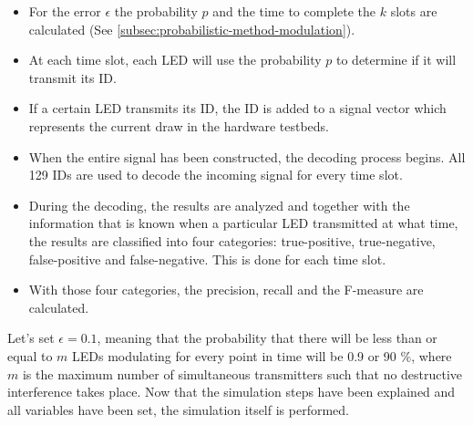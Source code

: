 \begin{itemize}

	\item For the error $\epsilon$ the probability $p$ and the time to complete the $k$ slots are calculated (See \autoref{subsec:probabilistic-method-modulation}).

	\item At each time slot, each LED will use the probability $p$ to determine if it will transmit its ID.

	\item If a certain LED transmits its ID, the ID is added to a signal vector which represents the current draw in the hardware testbeds.

	\item When the entire signal has been constructed, the decoding process begins. All 129 IDs are used to decode the incoming signal for every time slot.

	\item During the decoding, the results are analyzed and together with the information that is known when a particular LED transmitted at what time, the results are classified into four categories: true-positive, true-negative, false-positive and false-negative. This is done for each time slot.

	\item With those four categories, the precision, recall and the F-measure are calculated.



\end{itemize}




Let's set $\epsilon = 0.1$, meaning that the probability that there will be less than or equal to $m$ LEDs modulating for every point in time will be 0.9 or 90 \%, where $m$ is the maximum number of simultaneous transmitters such that no destructive interference takes place.
Now that the simulation steps have been explained and all variables have been set, the simulation itself is performed. 

